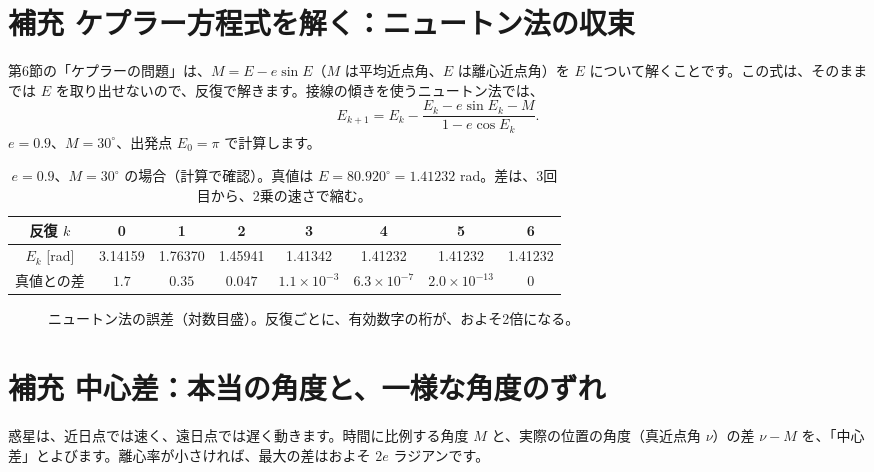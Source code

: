 \documentclass[a4paper,11pt,openany]{ltjsbook}
\begin{document}
\section{補充 ケプラー方程式を解く：ニュートン法の収束}

第6節の「ケプラーの問題」は、$M=E-e\sin E$（$M$ は平均近点角、$E$ は離心近点角）を $E$ について解くことです。この式は、そのままでは $E$ を取り出せないので、反復で解きます。接線の傾きを使うニュートン法では、
\[
E_{k+1}=E_k-\frac{E_k-e\sin E_k-M}{1-e\cos E_k}.
\]
$e=0.9$、$M=30^\circ$、出発点 $E_0=\pi$ で計算します。

\begin{table}[htbp]
\centering
\begin{tabular}{c|ccccccc}
\toprule
反復 $k$ & 0 & 1 & 2 & 3 & 4 & 5 & 6\\
\midrule
$E_k$ [rad] & 3.14159 & 1.76370 & 1.45941 & 1.41342 & 1.41232 & 1.41232 & 1.41232\\
真値との差 & $1.7$ & $0.35$ & $0.047$ & $1.1\times10^{-3}$ & $6.3\times10^{-7}$ & $2.0\times10^{-13}$ & $0$\\
\bottomrule
\end{tabular}
\caption{$e=0.9$、$M=30^\circ$ の場合（計算で確認）。真値は $E=80.920^\circ=1.41232$ rad。差は、3回目から、2乗の速さで縮む。}
\end{table}

\begin{figure}[htbp]
\centering
{}
\caption{ニュートン法の誤差（対数目盛）。反復ごとに、有効数字の桁が、およそ2倍になる。}
\end{figure}

\section{補充 中心差：本当の角度と、一様な角度のずれ}

惑星は、近日点では速く、遠日点では遅く動きます。時間に比例する角度 $M$ と、実際の位置の角度（真近点角 $\nu$）の差 $\nu-M$ を、「中心差」とよびます。離心率が小さければ、最大の差はおよそ $2e$ ラジアンです。
\end{document}
